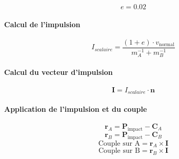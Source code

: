     \begin{equation}
    e = 0.02
    \end{equation}

    \paragraph{Calcul de l'impulsion}

    \begin{equation}
    I_{scalaire} = \frac{(1 + e) \cdot v_{\text{normal}}}{m_A^{-1} + m_B^{-1}}
    \end{equation}

    \paragraph{Calcul du vecteur d'impulsion}

    \begin{equation}
    \mathbf{I} = I_{scalaire} \cdot \mathbf{n}
    \end{equation}

    \paragraph{Application de l'impulsion et du couple}

    \begin{equation}
    \mathbf{r}_A = \mathbf{P}_{\text{impact}} - \mathbf{C}_A
    \end{equation}
    \begin{equation}
    \mathbf{r}_B = \mathbf{P}_{\text{impact}} - \mathbf{C}_B
    \end{equation}
    \begin{equation}
    \text{Couple sur A} = \mathbf{r}_A \times \mathbf{I}
    \end{equation}
    \begin{equation}
    \text{Couple sur B} = \mathbf{r}_B \times \mathbf{I}
    \end{equation}

